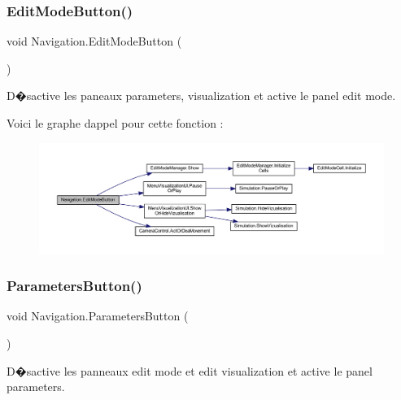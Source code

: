 \subsubsection{\texorpdfstring{Edit\+Mode\+Button()}{EditModeButton()}}
{\footnotesize\ttfamily void Navigation.\+Edit\+Mode\+Button (\begin{DoxyParamCaption}{ }\end{DoxyParamCaption})\hspace{0.3cm}{\ttfamily [inline]}}



D�sactive les paneaux parameters, visualization et active le panel edit mode. 

Voici le graphe d\textquotesingle{}appel pour cette fonction \+:
\nopagebreak
\begin{figure}[H]
\begin{center}
\leavevmode
\includegraphics[width=350pt]{class_navigation_af687f3df18da0e95175b04fe5cc7da56_cgraph}
\end{center}
\end{figure}
\mbox{\label{class_navigation_adf000d0931e06c79e1e66f266d93e313}} 
\subsubsection{\texorpdfstring{Parameters\+Button()}{ParametersButton()}}
{\footnotesize\ttfamily void Navigation.\+Parameters\+Button (\begin{DoxyParamCaption}{ }\end{DoxyParamCaption})\hspace{0.3cm}{\ttfamily [inline]}}



D�sactive les panneaux edit mode et edit visualization et active le panel parameters. 

